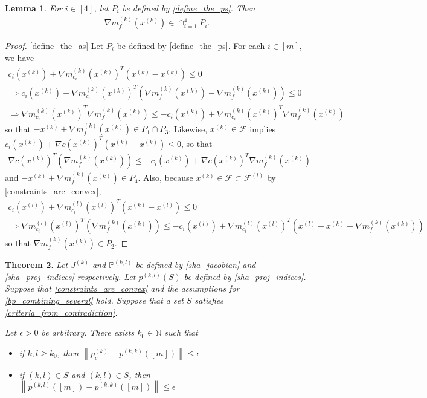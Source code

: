 \documentclass{article}
\newtheorem{theorem}{Theorem}[section]
\newtheorem{lemma}[theorem]{Lemma}
\theoremstyle{case}
\numberwithin{theorem}{subsection}
\newcommand{\feasiblel}{{\mathcal F^{(l)}}}
\newcommand{\feasible}{{\mathcal F}}
\newcommand{\gk}{{\nabla m_f^{(k)}\left(\xk\right)}}
\newcommand{\gmcik}{{\nabla m_{c_i}^{(k)}\left(\xk\right)}}
\newcommand{\gmcil}{{\nabla m_{c_i}^{(l)}\left(\xl\right)}}
\newcommand{\naturals}{\mathbb N}
\newcommand{\xk}{x^{(k)}}
\newcommand{\xl}{{x^{(l)}}}
\newcommand{\projkl}{{p^{(k,l)}}}
\newcommand{\projkk}{{p^{(k,k)}}}
\newcommand{\trueprojk}{{p_c^{(k)}}}
\newcommand{\activeprojkl}{{\mathbb P^{(k, l)}}}
\newcommand{\jackk}{{J^{(k)}}}
\begin{document}
\begin{lemma}
\label{the_gradient_is_in_em_all}
For $i \in [4]$, let $P_i$ be defined by \cref{define_the_ps}.
Then
\begin{align*}
\gk \in \cap_{i = 1}^4 P_i.
\end{align*}
\end{lemma}
\begin{proof}

\cref{define_the_as}
Let $P_i$ be defined by \cref{define_the_ps}.
For each $i \in [m]$, we have
\begin{align*}
c_i\left(\xk\right) + \gmcik^T \left(\xk - \xk\right)  \le 0 \\
\Longrightarrow c_i\left(\xk\right) + \gmcik^T \left(\gk - \gk \right)  \le 0 \\
\Longrightarrow \gmcik^T \gk  \le -c_i\left(\xk\right) + \gmcik^T\gk
\end{align*}
so that $-\xk + \gk \in P_1 \cap P_3$.
Likewise, $\xk \in \feasible$ implies $c_i\left(\xk\right) + \nabla c\left(\xk\right)^T \left(\xk-\xk\right)  \le 0$, so that
\begin{align*}
\nabla c\left(\xk\right)^T \left(\gk\right)  \le -c_i\left(\xk\right) + \nabla c\left(\xk\right)^T\gk
\end{align*}
and $-\xk + \gk \in P_4$.
Also, because $\xk \in \feasible \subset \feasiblel$ by \cref{constraints_are_convex},
\begin{align*}
c_i\left(\xl\right) + \gmcil^T \left(\xk - \xl\right) \le 0 \\
\Longrightarrow \gmcil^T \left(\gk\right) \le -c_i\left(\xl\right) + \gmcil^T\left(\xl - \xk + \gk\right)
\end{align*}
so that $\gk \in P_2$.
\end{proof}









\begin{theorem}
\label{bounded_projection_theorem}
Let $\jackk$ and $\activeprojkl$ be defined by \cref{sha_jacobian} and \cref{sha_proj_indices} respectively.
Let
$\projkl(S)$
be defined by
\cref{sha_proj_indices}.
Suppose that 
\cref{constraints_are_convex}
and the assumptions for
\cref{bp_combining_several}
hold.
Suppose that a set $S$ satisfies \cref{criteria_from_contradiction}.

Let $\epsilon > 0$ be arbitrary.
There exists $k_0 \in \naturals$ such that 
\begin{itemize}
\item if $k, l \ge k_0$, then
$\left\| \trueprojk - \projkk\left([m]\right) \right\| \le \epsilon$
\item if $(k, l) \in S$ and $(k, l) \in S$, then
$\left\| \projkl\left([m]\right) - \projkk\left([m]\right) \right\| \le \epsilon$
\end{itemize}
\end{theorem}
\end{document}
